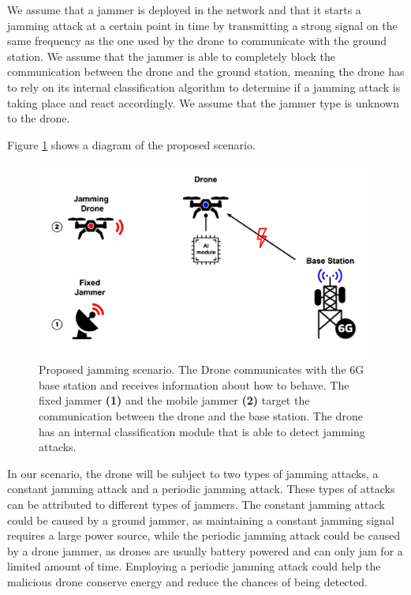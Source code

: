 \documentclass[futureinternet,article,submit,pdftex,moreauthors]{Definitions/mdpi}
\begin{document}
We assume that a jammer is deployed in the network and that it starts a jamming attack at a certain point in time by transmitting a strong signal on the same frequency as the one used by the drone to communicate with the ground station.
We assume that the jammer is able to completely block the communication between the drone and the ground station, meaning the drone has to rely on its internal classification algorithm to determine if a jamming attack is taking place and react accordingly.
We assume that the jammer type is unknown to the drone. 

Figure \ref{fig:CombinedJammingscenariosDiagram} shows a diagram of the proposed scenario. 

\begin{figure}[H]
	\includegraphics[width=10.5 cm]{img/CombinedJammingscenariosDiagram.jpg}
	\caption{Proposed jamming scenario. The Drone communicates with the 6G base station and receives information about how to behave. The fixed jammer \textbf{(1)} and the mobile jammer \textbf{(2)} target the communication between the drone and the base station. The drone has an internal classification module that is able to detect jamming attacks.}
	\label{fig:CombinedJammingscenariosDiagram}
	\end{figure}   
	\unskip


In our scenario, the drone will be subject to two types of jamming attacks, a constant jamming attack and a periodic jamming attack.
These types of attacks can be attributed to different types of jammers. The constant jamming attack could be caused by a ground jammer, as maintaining a constant jamming signal requires a large power source, while 
the periodic jamming attack could be caused by a drone jammer, as drones are usually battery powered and can only jam for a limited amount of time. 
Employing a periodic jamming attack could help the malicious drone conserve energy and reduce the chances of being detected.
\end{document}
